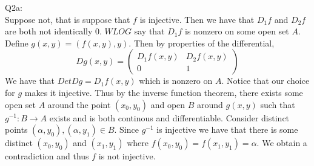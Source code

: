 \documentclass[letterpaper]{article}
\begin{document}
Q2a:\\
Suppose not, that is suppose that $f$ is injective. Then we have that $D_1f$ and $D_2f$ are both not identically $0$. $WLOG$ say that $D_1f$ is nonzero on some open set $A$. 
Define $g(x,y) = (f(x,y),y)$. Then by properties of the differential, $$Dg(x,y) = \begin{pmatrix}
 D_1f(x,y)   & D_2f(x,y) \\ 0 & 1
\end{pmatrix}$$ We have that $Det Dg = D_1f(x,y)$ which is nonzero on $A$. Notice that our choice for $g$ makes it injective.  Thus by the inverse function theorem, there exists some open set $A$ around the point $(x_0,y_0)$ and open $B$ around $g(x,y)$ such that $g^{-1}:B \rightarrow A$ exists and is both continous and differentiable. 
Consider distinct points $(\alpha,y_0), (\alpha,y_1)\in B$. Since $g^{-1}$ is injective we have that there is some distinct $(x_0,y_0)$ and $(x_1,y_1)$ where $f(x_0,y_0)= f(x_1,y_1) =\alpha $. We obtain a contradiction and thus $f$ is not injective. 
\end{document}
